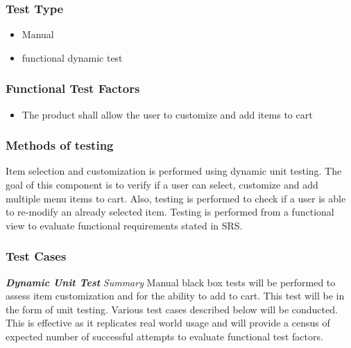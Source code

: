 \documentclass[12pt]{article}
\begin{document}
\subsubsection{Test Type}
\begin{itemize}
  \item Manual 
  \item functional dynamic test 
 \end{itemize} 
 
\subsubsection{Functional Test Factors}
\begin{itemize}
  \item The product shall allow the user to customize and add items to cart
 \end{itemize} 
 
\subsubsection{Methods of testing}
Item selection and customization is performed using  dynamic unit testing. The goal of this component is to verify if a user can select, customize and add multiple menu items to cart. Also, testing is performed to check if a user is able to re-modify an already selected item.  Testing is performed from a functional view to evaluate functional requirements stated in SRS.

\subsubsection{Test Cases}
\textbf{\textit{Dynamic Unit Test}}\newline
\newline
\textit{Summary}\newline
Manual black box tests will be performed to assess item customization and for the ability to add to cart. This test will be in the form of unit testing. Various test cases described below will be conducted. This is effective as it replicates real world usage and will provide a census of expected number of successful attempts to evaluate functional test factors.
\end{document}
